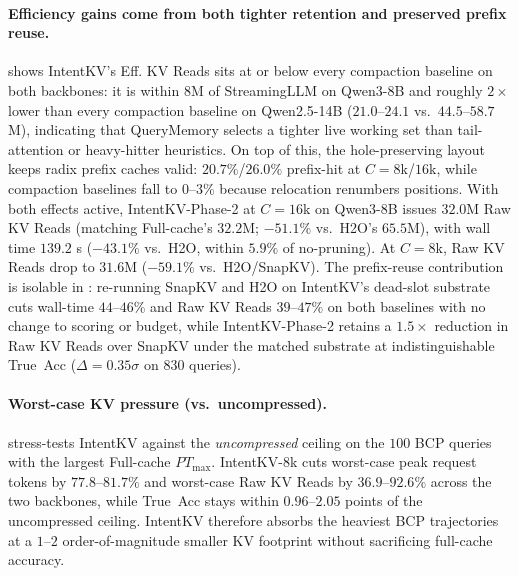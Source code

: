\documentclass[11pt]{article}
\newcommand{\method}{IntentKV\xspace}
\newcommand{\learn}{Phase-2\xspace}
\begin{document}
\paragraph{Efficiency gains come from both tighter retention and
preserved prefix reuse.}
 shows \method's Eff. KV Reads sits at
or below every compaction baseline on both backbones: it is within
$8$M of StreamingLLM on Qwen3-8B and roughly $2\times$ lower than
every compaction baseline on Qwen2.5-14B ($21.0$--$24.1$ vs.\
$44.5$--$58.7$M), indicating that QueryMemory selects a tighter
live working set than tail-attention or heavy-hitter heuristics.
On top of this, the hole-preserving layout keeps radix prefix
caches valid: $20.7\%$/$26.0\%$ prefix-hit at $C{=}8$k/$16$k,
while compaction baselines fall to $0$--$3\%$ because relocation
renumbers positions. With both effects active, \method-\learn at
$C{=}16$k on Qwen3-8B issues $32.0$M Raw KV Reads (matching
Full-cache's $32.2$M; $-51.1\%$ vs.\ H2O's $65.5$M), with wall
time $139.2$ s ($-43.1\%$ vs.\ H2O, within $5.9\%$ of no-pruning).
At $C{=}8$k, Raw KV Reads drop to $31.6$M ($-59.1\%$ vs.\
H2O/SnapKV). The prefix-reuse contribution is isolable in
\Cref{appendix:layout-ablation}: re-running SnapKV and H2O on
\method's dead-slot substrate cuts wall-time $44$--$46\%$ and Raw
KV Reads $39$--$47\%$ on both baselines with no change to scoring
or budget, while \method-\learn retains a $1.5\times$ reduction in
Raw KV Reads over SnapKV under the matched substrate at
indistinguishable True~Acc ($\Delta{=}0.35\sigma$ on $830$ queries).

\paragraph{Worst-case KV pressure (vs.\ uncompressed).}
 stress-tests \method against the
\emph{uncompressed} ceiling on the $100$ BCP queries with the
largest Full-cache $PT_{\max}$. \method-$8$k cuts worst-case peak
request tokens by $77.8$--$81.7\%$ and worst-case Raw KV Reads by
$36.9$--$92.6\%$ across the two backbones, while True~Acc stays
within $0.96$--$2.05$ points of the uncompressed ceiling.
\method therefore absorbs the heaviest BCP trajectories at a
$1$--$2$ order-of-magnitude smaller KV footprint without
sacrificing full-cache accuracy.
\end{document}

